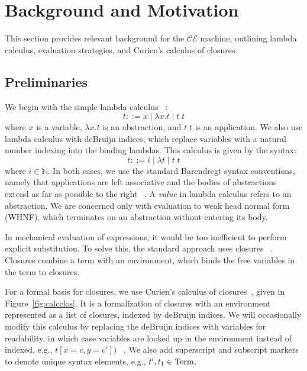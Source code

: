 \section{Background and Motivation} \label{sec:back}

This section provides relevant background for the $\mathcal{CE}$ machine,
outlining lambda calculus, evaluation strategies, and Curien's calculus of
closures.

\subsection{Preliminaries}

We begin with the simple lambda calculus ~\cite{barendregt1984lambda}:  $$ t::= x
\; | \;  \lambda x.t \; | \;  t \; t $$ where $x$ is a variable, $\lambda x.t$
is an abstraction, and $t \; t$ is an application. We also use lambda calculus
with deBruijn indices, which replace variables with a natural number indexing
into the binding lambdas.  This calculus is given by the syntax: $$ t::= i \; |
\; \lambda t \; | \; t \; t $$ where $i \in \mathbb{N}$. In both cases, we use
the standard Barendregt syntax conventions, namely that applications are left
associative and the bodies of abstractions extend as far as possible to the
right ~\cite{barendregt1984lambda}.  A \emph{value} in lambda calculus refers to
an abstraction. We are concerned only with evaluation to weak head normal form
(WHNF), which terminates on an abstraction without entering its body.

In mechanical evaluation of expressions, it would be too inefficient to perform
explicit substitution. To solve this, the standard approach uses closures
~\cite{landin1964mechanical,curien1991abstract,jonesstg,biernacka2007concrete}.
Closures combine a term with an environment, which binds the free variables in
the term to closures. 

For a formal basis for closures, we use Curien's calculus of
closures~\cite{curien1991abstract}, given in Figure~\ref{fig:calcclos}.  It is a
formalization of closures with an environment represented as a list of closures,
indexed by deBruijn indices. We will occasionally modify this calculus by
replacing the deBruijn indices with variables for readability, in which case
variables are looked up in the environment instead of indexed, e.g., $t[x = c, y
= c'])$ ~\cite{barendregt1984lambda}. We also add superscript and subscript
markers to denote unique syntax elements, e.g., $t', t_1 \in \textnormal{Term}$. 

